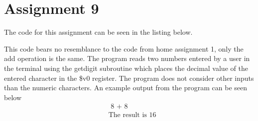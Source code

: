 \section{Assignment 9}
The code for this assignment can be seen in the listing below.

This code bears no resemblance to the code from home assignment 1, only the add operation is the same. The program 
reads two numbers entered by a user in the terminal using the getdigit subroutine which places the decimal value
of the entered character in the \$v0 register. The program does not consider other inputs than the numeric characters.
An example output from the program can be seen below
\begin{align*}
&\text{ 8 + 8 } \\
&\text{The result is 16} \\
\end{align*} 
